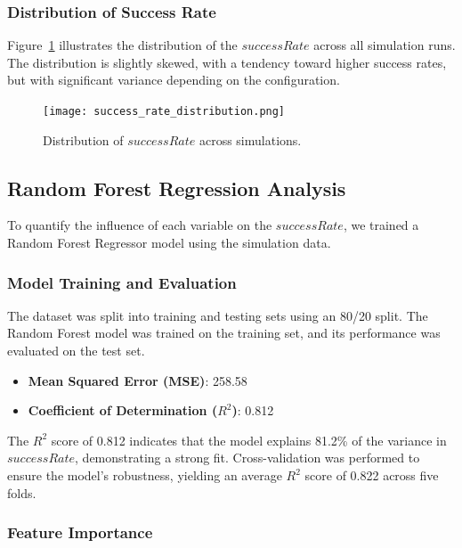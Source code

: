 \documentclass[runningheads]{llncs}
\begin{document}
\subsubsection{Distribution of Success Rate}

Figure~\ref{fig:success_rate_distribution} illustrates the distribution of the $successRate$ across all simulation runs. The distribution is slightly skewed, with a tendency toward higher success rates, but with significant variance depending on the configuration.

\begin{figure}[h] \centering %
\texttt{[image: success\_rate\_distribution.png]} \caption{Distribution of $successRate$ across simulations.} 
\label{fig:success_rate_distribution} \end{figure}

\subsection{Random Forest Regression Analysis}

To quantify the influence of each variable on the $successRate$, we trained a Random Forest Regressor model using the simulation data.

\subsubsection{Model Training and Evaluation}

The dataset was split into training and testing sets using an 80/20 split. The Random Forest model was trained on the training set, and its performance was evaluated on the test set.

\begin{itemize} \item \textbf{Mean Squared Error (MSE)}: 258.58 \item \textbf{Coefficient of Determination ($R^2$)}: 0.812 \end{itemize}

The $R^2$ score of 0.812 indicates that the model explains 81.2\% of the variance in $successRate$, demonstrating a strong fit. Cross-validation was performed to ensure the model's robustness, yielding an average $R^2$ score of 0.822 across five folds.

\subsubsection{Feature Importance}
\end{document}
